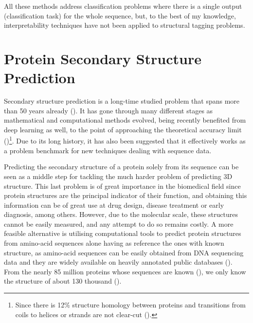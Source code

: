 All these methods address classification problems where there is a single output (classification task) for the whole sequence, but, to the best of my knowledge, interpretability techniques have not been applied to structural tagging problems.


\section{Protein Secondary Structure Prediction}


Secondary structure prediction is a long-time studied problem that spans more than 50 years already (\cite{Pauling1951}). It has gone through many different stages as mathematical and computational methods evolved, being recently benefited from deep learning as well, to the point of approaching the theoretical accuracy limit (\cite{Heffernan2017})\footnote{Since there is 12\% structure homology between proteins and transitions from coils to helices or strands are not clear-cut (\cite{Rost2001}).}. Due to its long history, it has also been suggested that it effectively works as a problem benchmark for new techniques dealing with sequence data.

Predicting the secondary structure of a protein solely from its sequence can be seen as a middle step for tackling the much harder problem of predicting 3D structure. This last problem is of great importance in the biomedical field since protein structures are the principal indicator of their function, and obtaining this information can be of great use at drug design, disease treatment or early diagnosis, among others. However, due to the molecular scale, these structures cannot be easily measured, and any attempt to do so remains costly. A more feasible alternative is utilising computational tools to predict protein structures from amino-acid sequences alone having as reference the ones with known structure, as amino-acid sequences can be easily obtained from DNA sequencing data and they are widely available on heavily annotated public databases (\cite{Dill2012}). From the nearly 85 million proteins whose sequences are known (\cite{Hattori2017}), we only know the structure of about 130 thousand (\cite{Magnan2014}).

